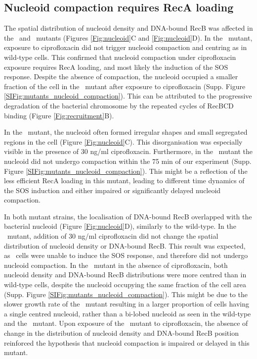 \subsection*{Nucleoid compaction requires RecA loading}
The spatial distribution of nucleoid density and DNA-bound RecB was affected in the \dreca\ and \geneteneighty\ mutants (Figures \ref{Fig:nucleoid}C and \ref{Fig:nucleoid}D). In the \dreca\ mutant, exposure to ciprofloxacin did not trigger nucleoid compaction and centring as in wild-type cells. This confirmed that nucleoid compaction under ciprofloxacin exposure requires RecA loading, and most likely the induction of the SOS response. Despite the absence of compaction, the nucleoid occupied a smaller fraction of the cell in the \dreca\ mutant after exposure to ciprofloxacin (Supp. Figure \ref{SIFig:mutants_nucleoid_compaction}). This can be attributed to the progressive degradation of the bacterial chromosome by the repeated cycles of RecBCD binding (Figure \ref{Fig:recruitment}B).

In the \geneteneighty\ mutant, the nucleoid often formed irregular shapes and small segregated regions in the cell (Figure \ref{Fig:nucleoid}C). This disorganisation was especially visible in the presence of 30 ng/ml ciprofloxacin. Furthermore, in the \geneteneighty\ mutant the nucleoid did not undergo compaction within the 75 min of our experiment (Supp. Figure \ref{SIFig:mutants_nucleoid_compaction}). This might be a reflection of the less efficient RecA loading in this mutant, leading to different time dynamics of the SOS induction and either impaired or significantly delayed nucleoid compaction.

In both mutant strains, the localisation of DNA-bound RecB overlapped with the bacterial nucleoid (Figure \ref{Fig:nucleoid}D), similarly to the wild-type. In the \dreca\ mutant, addition of 30 ng/ml ciprofloxacin did not change the spatial distribution of nucleoid density or DNA-bound RecB. This result was expected, as \dreca\ cells were unable to induce the SOS response, and therefore did not undergo nucleoid compaction. In the \geneteneighty\ mutant in the absence of ciprofloxacin, both nucleoid density and DNA-bound RecB distributions were more centred than in wild-type cells, despite the nucleoid occupying the same fraction of the cell area (Supp. Figure \ref{SIFig:mutants_nucleoid_compaction}). This might be due to the slower growth rate of the \teneighty\ mutant resulting in a larger proportion of cells having a single centred nucleoid, rather than a bi-lobed nucleoid as seen in the wild-type and the \dreca\ mutant. Upon exposure of the \geneteneighty\ mutant to ciprofloxacin, the absence of change in the distribution of nucleoid density and DNA-bound RecB position reinforced the hypothesis that nucleoid compaction is impaired or delayed in this mutant.

